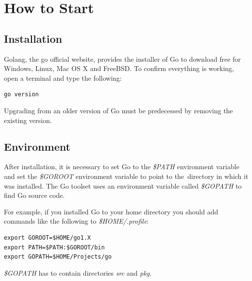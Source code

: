 \documentclass[
  twoside, 12pt, 
  printed, %
  notable,   %
  lof,     %
  lot,     %
]{fithesis3}
\begin{document}
\section{How to Start}\label{howToStart}
\subsection{Installation}
Golang, the go official website, provides the installer of Go to download free for Windows, 
Linux, Mac OS X and FreeBSD. To confirm everything is working, open a terminal and 
type the following:
\begin{lstlisting}
go version
\end{lstlisting}
Upgrading from an older version of Go must be predecessed by removing the existing version. 

\subsection{Environment}
After installation, it is necessary to set Go to the \textit{\$PATH} environment variable and set the \textit{\$GOROOT} environment variable to point to the~directory in which it was installed. The Go toolset uses an environment variable called \textit{\$GOPATH} to find Go source code. 

For example, if you installed Go to your home directory you should add commands like the following to \textit{\$HOME/.profile}:
\begin{lstlisting}
export GOROOT=$HOME/go1.X
export PATH=$PATH:$GOROOT/bin
export GOPATH=$HOME/Projects/go
\end{lstlisting}
\textit{\$GOPATH} has to contain directories \textit{src} and \textit{pkg}.

\end{document}
